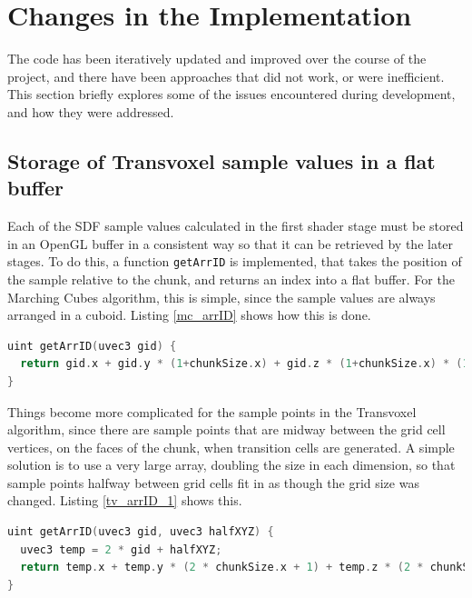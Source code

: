 \documentclass{article}
\begin{document}
\section{Changes in the Implementation}
The code has been iteratively updated and improved over the course of the project, and there have been approaches that did not work, or were inefficient. This section briefly explores some of the issues encountered during development, and how they were addressed.

\subsection{Storage of Transvoxel sample values in a flat buffer}
Each of the SDF sample values calculated in the first shader stage must be stored in an OpenGL buffer in a consistent way so that it can be retrieved by the later stages. To do this, a function \texttt{getArrID} is implemented, that takes the position of the sample relative to the chunk, and returns an index into a flat buffer. For the Marching Cubes algorithm, this is simple, since the sample values are always arranged in a cuboid. Listing \ref{mc_arrID} shows how this is done.
\begin{lstlisting}[language=C++,label={mc_arrID},caption={Function mapping grid position \texttt{gid} to flat array id}]
uint getArrID(uvec3 gid) {
  return gid.x + gid.y * (1+chunkSize.x) + gid.z * (1+chunkSize.x) * (1+chunkSize.y);
}
\end{lstlisting}

Things become more complicated for the sample points in the Transvoxel algorithm, since there are sample points that are midway between the grid cell vertices, on the faces of the chunk, when transition cells are generated. A simple solution is to use a very large array, doubling the size in each dimension, so that sample points halfway between grid cells fit in as though the grid size was changed. Listing \ref{tv_arrID_1} shows this.

\begin{lstlisting}[language=C++,label={tv_arrID_1},caption={Inefficient function mapping grid position \texttt{gid} and information about whether the sample point is in between the grid positions, \texttt{halfXYZ}, to a flat array id}]
uint getArrID(uvec3 gid, uvec3 halfXYZ) {
  uvec3 temp = 2 * gid + halfXYZ;
  return temp.x + temp.y * (2 * chunkSize.x + 1) + temp.z * (2 * chunkSize.x + 1) * (2 * chunkSize.y + 1);
}
\end{lstlisting}
\end{document}
